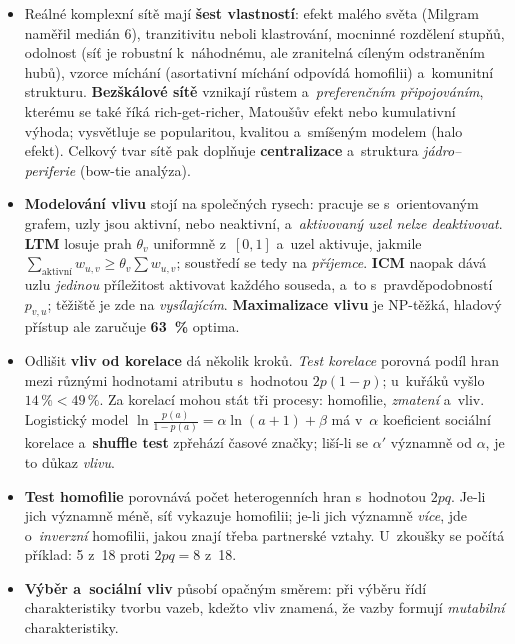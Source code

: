 \documentclass[11pt,a4paper]{article}
\theoremstyle{definition}
\begin{document}
\begin{itemize}
      průměrná vzdálenost a~excentricita. O~\textbf{malý svět} jde tam, kde je vysoké $C$
      a~zároveň krátká průměrná cesta.
\item Reálné komplexní sítě mají \textbf{šest vlastností}: efekt malého světa (Milgram naměřil
      medián 6), tranzitivitu neboli klastrování, mocninné rozdělení stupňů, odolnost (síť je
      robustní k~náhodnému, ale zranitelná cíleným odstraněním hubů), vzorce míchání
      (asortativní míchání odpovídá homofilii) a~komunitní strukturu. \textbf{Bezškálové sítě}
      vznikají růstem a~\emph{preferenčním připojováním}, kterému se také říká rich-get-richer,
      Matoušův efekt nebo kumulativní výhoda; vysvětluje se popularitou, kvalitou a~smíšeným
      modelem (halo efekt). Celkový tvar sítě pak doplňuje \textbf{centralizace} a~struktura
      \emph{jádro--periferie} (bow-tie analýza).
\item \textbf{Modelování vlivu} stojí na společných rysech: pracuje se s~orientovaným grafem,
      uzly jsou aktivní, nebo neaktivní, a~\emph{aktivovaný uzel nelze deaktivovat}. \textbf{LTM}
      losuje prah $\theta_v$ uniformně z~$[0,1]$ a~uzel aktivuje, jakmile
      $\sum_{\text{aktivní}}w_{u,v}\ge\theta_v\sum w_{u,v}$; soustředí se tedy na
      \emph{příjemce}. \textbf{ICM} naopak dává uzlu \emph{jedinou} příležitost aktivovat
      každého souseda, a~to s~pravděpodobností $p_{v,u}$; těžiště je zde na \emph{vysílajícím}.
      \textbf{Maximalizace vlivu} je NP-těžká, hladový přístup ale zaručuje \textbf{63~\%}
      optima.
\item Odlišit \textbf{vliv od korelace} dá několik kroků. \emph{Test korelace}
      porovná podíl hran mezi různými hodnotami atributu s~hodnotou $2p(1-p)$; u~kuřáků vyšlo
      $14\,\%<49\,\%$. Za korelací mohou stát tři procesy: homofilie, \emph{zmatení} a~vliv.
      Logistický model $\ln\frac{p(a)}{1-p(a)}=\alpha\ln(a+1)+\beta$ má v~$\alpha$ koeficient
      sociální korelace a~\textbf{shuffle test} zpřehází časové značky; liší-li se $\alpha'$
      významně od $\alpha$, je to důkaz \emph{vlivu}.
\item \textbf{Test homofilie} porovnává počet heterogenních hran s~hodnotou $2pq$. Je-li jich
      významně méně, síť vykazuje homofilii; je-li jich významně \emph{více}, jde
      o~\emph{inverzní} homofilii, jakou znají třeba partnerské vztahy. U~zkoušky se počítá
      příklad: 5 z~18 proti $2pq=8$ z~18.
\item \textbf{Výběr a~sociální vliv} působí opačným směrem: při výběru řídí charakteristiky
      tvorbu vazeb, kdežto vliv znamená, že vazby formují \emph{mutabilní} charakteristiky.

\end{itemize}
\end{document}
